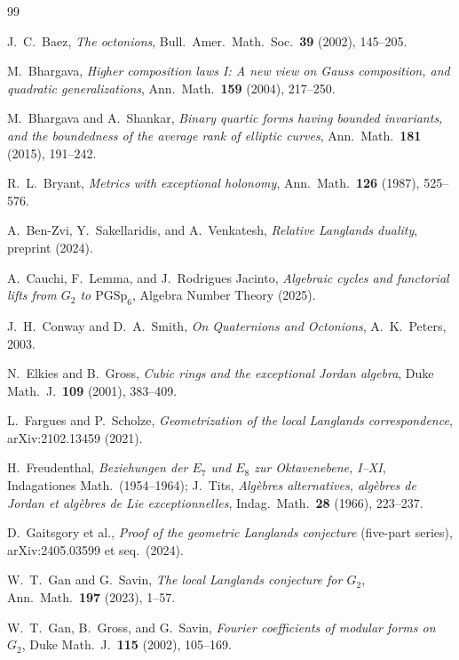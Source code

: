 \documentclass[11pt]{amsart}
\theoremstyle{plain}
\theoremstyle{definition}
\theoremstyle{remark}
\begin{document}
\begin{thebibliography}{99}

J.~C.~Baez,
\emph{The octonions},
Bull.\ Amer.\ Math.\ Soc.\ \textbf{39} (2002), 145--205.

M.~Bhargava,
\emph{Higher composition laws I: A new view on Gauss composition,
and quadratic generalizations},
Ann.\ Math.\ \textbf{159} (2004), 217--250.

M.~Bhargava and A.~Shankar,
\emph{Binary quartic forms having bounded invariants, and the boundedness
of the average rank of elliptic curves},
Ann.\ Math.\ \textbf{181} (2015), 191--242.

R.~L.~Bryant,
\emph{Metrics with exceptional holonomy},
Ann.\ Math.\ \textbf{126} (1987), 525--576.

A.~Ben-Zvi, Y.~Sakellaridis, and A.~Venkatesh,
\emph{Relative Langlands duality},
preprint (2024).

A.~Cauchi, F.~Lemma, and J.~Rodrigues Jacinto,
\emph{Algebraic cycles and functorial lifts from $G_2$ to $\mathrm{PGSp}_6$},
Algebra Number Theory (2025).

J.~H.~Conway and D.~A.~Smith,
\emph{On Quaternions and Octonions},
A.~K.~Peters, 2003.

N.~Elkies and B.~Gross,
\emph{Cubic rings and the exceptional Jordan algebra},
Duke Math.\ J.\ \textbf{109} (2001), 383--409.

L.~Fargues and P.~Scholze,
\emph{Geometrization of the local Langlands correspondence},
arXiv:2102.13459 (2021).

H.~Freudenthal, \emph{Beziehungen der $E_7$ und $E_8$ zur Oktavenebene, I--XI},
Indagationes Math.\ (1954--1964);
J.~Tits,
\emph{Alg\`ebres alternatives, alg\`ebres de Jordan et alg\`ebres de Lie exceptionnelles},
Indag.\ Math.\ \textbf{28} (1966), 223--237.

D.~Gaitsgory et al.,
\emph{Proof of the geometric Langlands conjecture} (five-part series),
arXiv:2405.03599 et seq.\ (2024).

W.~T.~Gan and G.~Savin,
\emph{The local Langlands conjecture for $G_2$},
Ann.\ Math.\ \textbf{197} (2023), 1--57.

W.~T.~Gan, B.~Gross, and G.~Savin,
\emph{Fourier coefficients of modular forms on $G_2$},
Duke Math.\ J.\ \textbf{115} (2002), 105--169.


\end{thebibliography}
\end{document}
